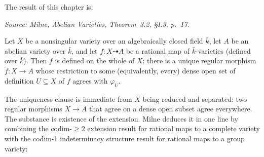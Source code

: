 The result of this chapter is:

\begin{theorem}

  \label{thm:rational_map_to_av_extends}

  \textit{Source: Milne, \emph{Abelian Varieties}, Theorem~3.2, \S I.3, p.~17.}

  Let \(X\) be a nonsingular variety over an algebraically closed field \(\bar k\), let \(A\) be
  an abelian variety over \(\bar k\), and let \(f \colon X \dashrightarrow A\) be a rational
  map of \(\bar k\)-varieties (defined over \(\bar k\)).
  Then \(f\) is defined on the whole of \(X\): there is a unique regular morphism
  \(\widetilde f \colon X \to A\) whose restriction to some (equivalently, every) dense open
  set of definition \(U \subseteq X\) of \(f\) agrees with \(\varphi_U\).
\end{theorem}

The uniqueness clause is immediate from \(X\) being reduced and separated: two regular
morphisms \(X \to A\) that agree on a dense open subset agree everywhere. The substance is
existence of the extension. Milne deduces it in one line by combining the codim-\(\geq 2\)
extension result for rational maps to a complete variety with the codim-1 indeterminacy
structure result for rational maps to a group variety:

